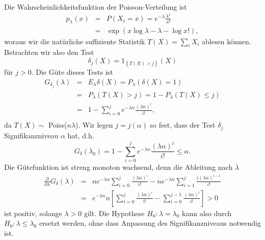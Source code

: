 Die Wahrscheinlichkeitsfunktion der Poisson-Verteilung ist
\begin{eqnarray}
    p_\lambda(x) &=& P\left( X_i=x \right) = e^{-\lambda} \frac{\lambda^x}{x!} \\
    &=& \exp \left( x \log \lambda -\lambda - \log x! \right),
\end{eqnarray}
woraus wir die natürliche suffiziente Statistik $T(X)= \sum_{i}^{} X_i$ ablesen können.
Betrachten wir also den Test
\begin{equation}
    \delta_j (X) = 1_{ \left\{ T(X) >j \right\}  } \left( X \right)
\end{equation}
für $j>0$. Die Güte dieses Tests ist 
\begin{eqnarray}
    G_{\delta_j} (\lambda) &=&  E_\lambda \delta(X) = P_\lambda \left( \delta(X)=1 \right) \\
    &=& P_\lambda \left( T(X) > j \right) =  1-P_\lambda \left( T(X) \leq j \right) \\
    &=& 1 - \sum_{i=0}^{j} e^{-\lambda n} \frac{\left( \lambda n \right)^i}{i!}, \\
\end{eqnarray}
da $T(X)\sim$ Poiss($n\lambda$). Wir legen $j=j(\alpha)$ so fest, dass der Test $\delta_j$ 
Signifikanzniveau $\alpha$ hat, d.h.\ 
\begin{equation}
    G_\delta (\lambda_0) = 1 - \sum_{i=0}^{j} e^{-\lambda n} \frac{\left( \lambda n \right)^i}{i!} \leq \alpha.
\end{equation}
Die Gütefunktion ist streng monoton wachsend, denn die Ableitung nach $\lambda$ 
\begin{eqnarray}
    \frac{\partial}{\partial \lambda} G_\delta (\lambda) &=& 
    n e^{-\lambda n} \sum_{i=0}^{j} \frac{\left( \lambda n \right)^i}{i!} 
    - n e^{ -\lambda n } \sum_{i=1}^{j} \frac{ i \left( \lambda n  \right)^{i-1} }{i!} \\
    &=& e^{-\lambda n }n \left[ \sum_{i=0}^{j} \frac{\left( \lambda n \right)^i}{i!}   
    - \sum_{i=0}^{j-1} \frac{ \left( \lambda n  \right)^{i} }{i!} \right] > 0 
\end{eqnarray}
ist positiv, solange $\lambda>0$ gilt. Die Hypothese $H_0 : \lambda=\lambda_0$ kann also 
durch $H_0 : \lambda\leq \lambda_0$ ersetzt werden, ohne dass Anpassung des Signifikanzniveaus 
notwendig ist.

